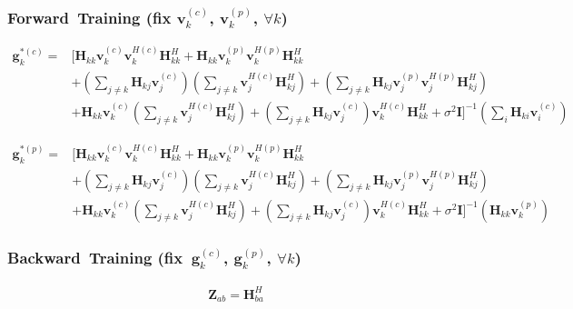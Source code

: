 \documentclass[11pt, oneside]{article}   	%
\begin{document}
\subsubsection{Forward\ Training (fix $\textbf{v}^{(c)}_{k}$, $\textbf{v}^{(p)}_{k}$, $\forall k$)}


\begin{align*}
\textbf{g}^{*(c)}_{k} = 
&\bigg[
\textbf{H}_{kk}	\textbf{v}^{(c)}_{k}	\textbf{v}^{H(c)}_{k}	\textbf{H}^{H}_{kk}
+\textbf{H}_{kk}	\textbf{v}^{(p)}_{k}	\textbf{v}^{H(p)}_{k}	\textbf{H}^{H}_{kk}	\\
&+(\displaystyle\sum_{j \neq k}\textbf{H}_{kj}\textbf{v}^{(c)}_{j})
(\displaystyle\sum_{j \neq k}\textbf{v}^{H(c)}_{j}\textbf{H}^{H}_{kj})
+(\displaystyle\sum_{j \neq k}\textbf{H}_{kj}\textbf{v}^{(p)}_{j} \textbf{v}^{H(p)}_{j}\textbf{H}^{H}_{kj})	\\
&+\textbf{H}_{kk}	\textbf{v}^{(c)}_{k}
(\displaystyle\sum_{j \neq k}\textbf{v}^{H(c)}_{j}\textbf{H}^{H}_{kj})
+(\displaystyle\sum_{j \neq k}\textbf{H}_{kj}\textbf{v}^{(c)}_{j})
\textbf{v}^{H(c)}_{k}	\textbf{H}^{H}_{kk}
+\sigma^2	\textbf{I}
\bigg]^{-1}	 	(\displaystyle\sum_{i}	\textbf{H}_{ki} 	\textbf{v}^{(c)}_{i})	
\end{align*}

\begin{align*}
\textbf{g}^{*(p)}_{k} = 	
&\bigg[
\textbf{H}_{kk}	\textbf{v}^{(c)}_{k}	\textbf{v}^{H(c)}_{k}	\textbf{H}^{H}_{kk}
+\textbf{H}_{kk}	\textbf{v}^{(p)}_{k}	\textbf{v}^{H(p)}_{k}	\textbf{H}^{H}_{kk}	\\
&+(\displaystyle\sum_{j \neq k}\textbf{H}_{kj}\textbf{v}^{(c)}_{j})
(\displaystyle\sum_{j \neq k}\textbf{v}^{H(c)}_{j}\textbf{H}^{H}_{kj})
+(\displaystyle\sum_{j \neq k}\textbf{H}_{kj}\textbf{v}^{(p)}_{j} \textbf{v}^{H(p)}_{j}\textbf{H}^{H}_{kj})	\\
&+\textbf{H}_{kk}	\textbf{v}^{(c)}_{k}
(\displaystyle\sum_{j \neq k}\textbf{v}^{H(c)}_{j}\textbf{H}^{H}_{kj})
+(\displaystyle\sum_{j \neq k}\textbf{H}_{kj}\textbf{v}^{(c)}_{j})
\textbf{v}^{H(c)}_{k}	\textbf{H}^{H}_{kk}
+\sigma^2	\textbf{I}
\bigg]^{-1}	 (\textbf{H}_{kk} 	\textbf{v}^{(p)}_{k})
\end{align*}


\subsubsection{Backward\ Training (fix\  $\textbf{g}^{(c)}_{k}$, $\textbf{g}^{(p)}_{k}$, $\forall k$)}


\begin{align*}
\textbf{Z}_{ab}=\textbf{H}^{H}_{ba} 
\end{align*}
\end{document}
